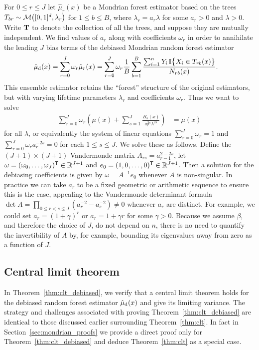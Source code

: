 For $0 \leq r \leq J$ let $\hat \mu_r(x)$ be a Mondrian forest estimator
based on the trees $T_{b r} \sim \mathcal{M}\big([0,1]^d, \lambda_r \big)$
for $1 \leq b \leq B$, where $\lambda_r = a_r \lambda$ for some $a_r > 0$
and $\lambda > 0$. Write $\mathbf{T}$ to denote the collection of all the trees,
and suppose they are mutually independent. We find values of $a_r$ along with
coefficients $\omega_r$ in order to annihilate the leading $J$ bias terms of
the debiased Mondrian random forest estimator
%
\begin{align}
  \label{eq:debiased}
  \hat \mu_{\mathrm{d}}(x)
  &= \sum_{r=0}^J \omega_r \hat \mu_r(x)
  = \sum_{r=0}^{J} \omega_r
  \frac{1}{B} \sum_{b=1}^B
  \frac{\sum_{i=1}^n Y_i \, \mathbb{I}\big\{ X_i \in T_{r b}(x) \big\}} {N_{r b}(x)}.
\end{align}
%
This ensemble estimator retains the ``forest'' structure of the original
estimators, but with varying lifetime parameters $\lambda_r$ and coefficients
$\omega_r$. Thus we want to solve
%
\begin{align*}
  \sum_{r=0}^{J} \omega_r
  \left( \mu(x) + \sum_{s=1}^{J} \frac{B_{s}(x)}{a_r^{2s} \lambda^{2s}} \right)
  &= \mu(x)
\end{align*}
%
for all $\lambda$, or equivalently the system of linear equations
$\sum_{r=0}^{J} \omega_r = 1$
and $\sum_{r=0}^{J} \omega_r a_r^{-2s} = 0$ for each $1 \leq s \leq J$.
We solve these as follows. Define the $(J+1) \times (J+1)$ Vandermonde matrix
$A_{r s} = a_{r-1}^{2-2s}$,
let $\omega = (\omega_0, \ldots, \omega_J)^{\mathsf{T}} \in \mathbb{R}^{J+1}$
and $e_0 = (1, 0, \ldots, 0)^{\mathsf{T}} \in \mathbb{R}^{J+1}$.
Then a solution for the debiasing coefficients is given by
$\omega = A^{-1} e_0$ whenever $A$ is non-singular.
In practice we can take $a_r$ to be a fixed geometric or arithmetic sequence
to ensure this is the case, appealing to the Vandermonde determinant formula
$\det A = \prod_{0 \leq r < s \leq J} (a_r^{-2} - a_s^{-2})
\neq 0$ whenever $a_r$ are distinct. For example, we could set
$a_r = (1 + \gamma)^r$ or $a_r = 1 + \gamma r$ for some $\gamma > 0$.
Because we assume $\beta$, and therefore the choice of $J$, do not
depend on $n$, there is no need to quantify
the invertibility of $A$ by, for example, bounding its eigenvalues
away from zero as a function of $J$.

\subsection{Central limit theorem}

In Theorem~\ref{thm:clt_debiased}, we verify that a central
limit theorem holds for the debiased
random forest estimator $\hat\mu_{\mathrm{d}}(x)$ and give its limiting variance.
The strategy and challenges associated with proving
Theorem~\ref{thm:clt_debiased} are identical to those discussed earlier
surrounding Theorem~\ref{thm:clt}. In fact in Section~\ref{sec:mondrian_proofs}
we provide a direct proof only for Theorem~\ref{thm:clt_debiased}
and deduce Theorem~\ref{thm:clt} as a special case.

